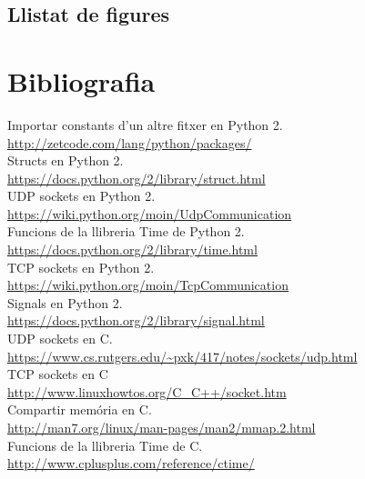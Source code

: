 \documentclass[11pt]{article}
\begin{document}
	\subsection{Llistat de figures}
\listoffigures{}
\newpage
\section{Bibliografia}
Importar constants d'un altre fitxer en Python 2.\\
\url{http://zetcode.com/lang/python/packages/}\\
Structs en Python 2.\\
\url{https://docs.python.org/2/library/struct.html}\\
UDP sockets en Python 2.\\
\url{https://wiki.python.org/moin/UdpCommunication}\\
Funcions de la llibreria Time de Python 2.\\	
\url{https://docs.python.org/2/library/time.html}\\
TCP sockets en Python 2.\\
\url{https://wiki.python.org/moin/TcpCommunication}\\
Signals en Python 2.\\	
\url{https://docs.python.org/2/library/signal.html}\\
UDP sockets en C.\\
\url{https://www.cs.rutgers.edu/~pxk/417/notes/sockets/udp.html}\\
TCP sockets en C\\
\url{http://www.linuxhowtos.org/C_C++/socket.htm}	\\
Compartir memória en C.\\
\url{http://man7.org/linux/man-pages/man2/mmap.2.html}\\
Funcions de la llibreria Time de C.\\
\url{http://www.cplusplus.com/reference/ctime/}\\
\end{document}
